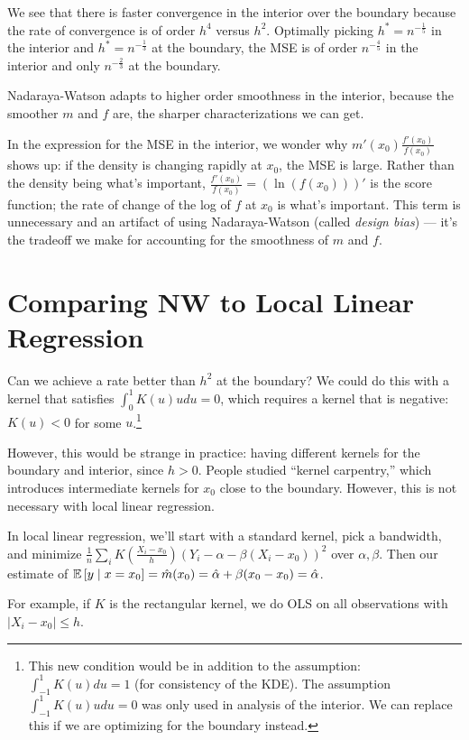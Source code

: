 We see that there is faster convergence in the interior over the boundary because the rate of convergence is of order $h^4$ versus $h^2$.
Optimally picking $h^* = n^{-\frac{1}{5}}$ in the interior and $h^* = n^{-\frac{1}{3}}$ at the boundary, the MSE is of order $n^{-\frac{4}{5}}$ in the interior and only $n^{-\frac{2}{3}}$ at the boundary.

Nadaraya-Watson adapts to higher order smoothness in the interior, because the smoother $m$ and $f$ are, the sharper characterizations we can get.

In the expression for the MSE in the interior, we wonder why $m'(x_0) \frac{f'(x_0)}{f(x_0)}$ shows up: if the density is changing rapidly at $x_0$, the MSE is large. Rather than the density being what's important, $\frac{f'(x_0)}{f(x_0)} = \left( \ln{\left(f(x_0)\right)} \right)'$ is the score function; the rate of change of the log of $f$ at $x_0$ is what's important. This term is unnecessary and an artifact of using Nadaraya-Watson (called \emph{design bias}) --- it's the tradeoff we make for accounting for the smoothness of $m$ and $f$.

\section{Comparing NW to Local Linear Regression}



Can we achieve a rate better than $h^2$ at the boundary? We could do this with a kernel that satisfies $\int_{0}^{1} K(u)udu = 0$, which requires a kernel that is negative: $K(u) < 0$ for some $u$.\footnote{This new condition would be in addition to the assumption: $\int_{-1}^{1} K(u)du = 1$ (for consistency of the KDE). The assumption $\int_{-1}^{1} K(u)udu = 0$ was only used in analysis of the interior. We can replace this if we are optimizing for the boundary instead.}

However, this would be strange in practice: having different kernels for the boundary and interior, since $h > 0$. People studied ``kernel carpentry,'' which introduces intermediate kernels for $x_0$ close to the boundary. However, this is not necessary with local linear regression.

\begin{remark}	In local linear regression, we'll start with a standard kernel, pick a bandwidth, and minimize $\frac{1}{n}\sum_i K\left( \frac{X_i - x_0}{h} \right)\left( Y_i - \alpha - \beta\left( X_i - x_0 \right) \right)^2$ over $\alpha,\beta$. Then our estimate of $\mathbb{E}\left[y \mid x = x_0\right] = \hat{m}(x_0) = \hat{\alpha} + \beta(x_0-x_0) = \hat{\alpha}$.

	For example, if $K$ is the rectangular kernel, we do OLS on all observations with $\left| X_i - x_0 \right| \le h$.
\end{remark}


